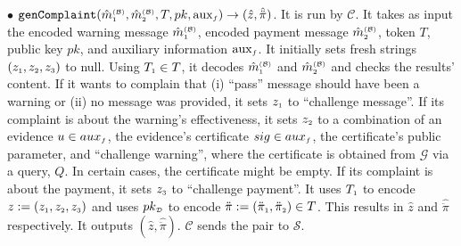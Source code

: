 \begin{definition}
\item  [$\bullet$] $\mathtt{genComplaint}(\hat m^{\scriptscriptstyle\mathcal{(B)}}_{\scriptscriptstyle 1}, \hat m^{\scriptscriptstyle\mathcal{(B)}}_{\scriptscriptstyle2}, T, pk, \text{aux}_{\scriptscriptstyle f})\rightarrow (\hat z, \hat{\ddot \pi})$. It is run by $\mathcal{C}$. It takes as input   the encoded warning message $\hat m^{\scriptscriptstyle\mathcal{(B)}}_{\scriptscriptstyle1}$, encoded payment message $\hat m^{\scriptscriptstyle\mathcal{(B)}}_{\scriptscriptstyle2}$,  token $T$, public key $pk$, and  auxiliary information $\text{aux}_{\scriptscriptstyle f}$. It initially sets fresh strings $(z_{\scriptscriptstyle 1}, z_{\scriptscriptstyle 2}, z_{\scriptscriptstyle 3})$ to null. Using $T_{\scriptscriptstyle 1}\in T$, it decodes  $\hat m^{\scriptscriptstyle\mathcal{(B)}}_{\scriptscriptstyle 1}$ and $\hat m^{\scriptscriptstyle\mathcal{(B)}}_{\scriptscriptstyle2}$ and checks the results' content. If it wants to complain that (i)   “pass” message should have been a warning  or (ii) no  message was provided,   it sets $z_{\scriptscriptstyle 1}$ to ``challenge message''. If its complaint is about the warning's effectiveness,  it sets $z_{\scriptscriptstyle 2}$ to a combination of an evidence $u\in aux_{\scriptscriptstyle f}$, the evidence's certificate $sig\in aux_{\scriptscriptstyle f}$, the certificate's public parameter,   and ``challenge warning'', where the certificate is obtained from  $\mathcal{G}$ via a query, $Q$. In certain cases, the certificate might be empty.  If its complaint is  about the   payment, it sets $z_{\scriptscriptstyle 3}$ to ``challenge payment''.  It uses $T_{\scriptscriptstyle 1}$ to encode $z:=(z_{\scriptscriptstyle 1}, z_{\scriptscriptstyle 2}, z_{\scriptscriptstyle 3})$ and uses $pk_{\scriptscriptstyle\mathcal D}$ to encode  $\ddot \pi:=(\ddot \pi_{\scriptscriptstyle 1},\ddot \pi_{\scriptscriptstyle 2})\in T$. This  results in $\hat z$ and $\hat {\ddot \pi}$ respectively. It outputs $(\hat z, \hat {\ddot \pi})$. $\mathcal{C}$ sends the pair to $\mathcal{S}$.
%
%
\vspace{2mm}

\end{definition}
